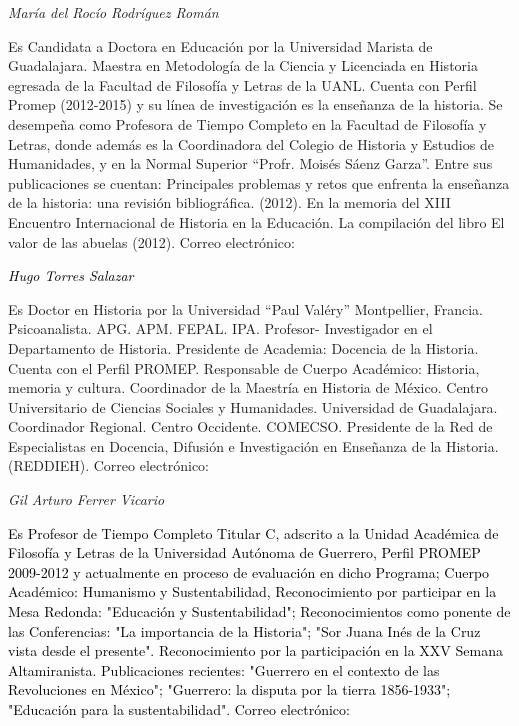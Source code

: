 \bigskip

{ 
\textit{María del Rocío Rodríguez Román}}

{ 
Es Candidata a Doctora en Educación por la Universidad Marista de
Guadalajara. Maestra en Metodología de la Ciencia y Licenciada en Historia
egresada de la Facultad de Filosofía y  Letras de la UANL. Cuenta con
Perfil Promep (2012-2015) y su línea de investigación es la enseñanza de la
historia. Se desempeña como Profesora de Tiempo Completo en la Facultad de
Filosofía y Letras,  donde además es la Coordinadora del Colegio de
Historia y Estudios de Humanidades,  y en la Normal Superior “Profr. Moisés
Sáenz Garza”. Entre sus publicaciones se cuentan: Principales problemas y
retos que enfrenta la enseñanza de la historia: una revisión bibliográfica.
(2012). En la memoria del XIII Encuentro Internacional de Historia en la
Educación. La compilación del libro El valor de las abuelas (2012). Correo
electrónico:\textit{
}\href{mailto:rocio_rodriguez_ens@yahoo.com.mx}{\textstyleInternetlink{\textit{\textcolor[rgb]{0.0,0.0,0.8}{rocio\_rodriguez\_ens@yahoo.com.mx}}}}\textstyleInternetlink{\textcolor[rgb]{0.0,0.0,0.8}{
}}\textstyleInternetlink{\textcolor[rgb]{0.0,0.0,0.039215688}{y
}}\href{mailto:colegiohistoria@yahoo.com.mx}{\textstyleInternetlink{\textit{\textcolor[rgb]{0.0,0.0,0.8}{colegiohistoria@yahoo.com.mx}}}}}


\bigskip

{ 
\textit{\textcolor{black}{Hugo Torres Salazar}}}

{ 
Es Doctor en Historia por la Universidad “Paul Valéry” Montpellier, Francia.
Psicoanalista. APG. APM. FEPAL. IPA. Profesor- Investigador en el
Departamento de Historia. Presidente de Academia: Docencia de la Historia.
Cuenta con el Perfil PROMEP. Responsable de Cuerpo Académico: Historia,
memoria y cultura. Coordinador de la Maestría en Historia de México. Centro
Universitario de Ciencias Sociales y Humanidades. Universidad de
Guadalajara. Coordinador Regional. Centro Occidente. COMECSO. Presidente de
la Red de Especialistas en Docencia, Difusión e Investigación en Enseñanza
de la Historia. (REDDIEH). Correo electrónico:\textit{
}\href{mailto:htorres@cencar.udg.mx}{}}


\bigskip

{ 
\textit{Gil Arturo Ferrer Vicario}}

{ 
\textcolor{black}{Es Profesor de Tiempo Completo Titular C, adscrito a la
Unidad Académica de Filosofía y Letras de la Universidad Autónoma de
Guerrero, Perfil PROMEP 2009-2012 y actualmente en proceso de evaluación en
dicho Programa; Cuerpo Académico: Humanismo y Sustentabilidad,
Reconocimiento por participar en la Mesa Redonda: "Educación y
Sustentabilidad"; Reconocimientos como ponente de las Conferencias: "La
importancia de la Historia"; "Sor Juana Inés de la Cruz vista desde el
presente". Reconocimiento por la participación en la XXV Semana
Altamiranista. Publicaciones recientes: "Guerrero en el contexto de las
Revoluciones en México"; "Guerrero: la disputa por la tierra 1856-1933";
"Educación para la sustentabilidad". Correo electrónico:
}\href{mailto:gil_uagro@hotmail.com}{\textstyleInternetlink{\textcolor[rgb]{0.0,0.0,0.8}{gil\_uagro@hotmail.com}}}}



